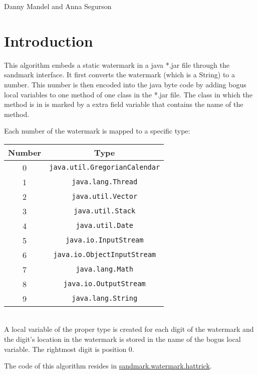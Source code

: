 %
          {Danny Mandel and Anna Segurson}

\section{Introduction}

This algorithm embeds a static watermark in a java *.jar file through
the sandmark interface. It first converts the watermark (which is a String)
to a number. This number is then encoded into the java byte code by adding
bogus local variables to one method of one class in the *.jar file. The
class in which the method is in is marked by a extra field variable that
contains the name of the method.

Each number of the watermark is mapped to a specific type:

\begin{center}
\begin{tabular}{| c | c |}
  \hline
  Number & Type \\
  \hline
  0 & \texttt{java.util.GregorianCalendar} \\
  \hline
  1 & \texttt{java.lang.Thread} \\
  \hline
  2 & \texttt{java.util.Vector} \\
  \hline
  3 & \texttt{java.util.Stack} \\
  \hline
  4 & \texttt{java.util.Date} \\
  \hline
  5 & \texttt{java.io.InputStream} \\
  \hline
  6 & \texttt{java.io.ObjectInputStream} \\
  \hline
  7 & \texttt{java.lang.Math} \\
  \hline
  8 & \texttt{java.io.OutputStream} \\
  \hline
  9 & \texttt{java.lang.String} \\
  \hline
\end{tabular}
\end{center}

\hfill \\
A local variable of the proper type is created for each digit of the watermark
and the digit's location in the watermark is stored in the name of the bogus
local variable. The rightmost digit is position $0$.


The code of this algorithm
resides in \url{sandmark.watermark.hattrick}.


